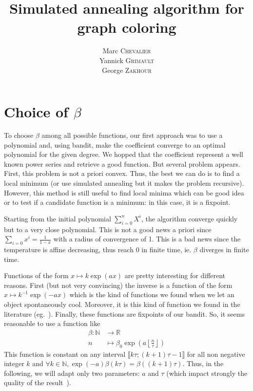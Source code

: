 \documentclass[a4paper, 11pt]{article}
\title{Simulated annealing algorithm for graph coloring}
\author{
	Marc \textsc{Chevalier}\\
	Yannick \textsc{Grimault}\\
	George \textsc{Zakhour}
}
\newcommand{\RR}{\mathbb{R}}
\newcommand{\NN}{\mathbb{N}}
\newcommand{\floor}[1]{{\left\lfloor #1 \right\rfloor}}
\begin{document}
\maketitle

\section{Choice of \texorpdfstring{$\beta$}{β}}


To choose $\beta$ among all possible functions, our first approach was to use a polynomial and, using bandit, make the coefficient converge to an optimal polynomial for the given degree. We hopped that the coefficient represent a well known power series and retrieve a good function. But several problem appears. First, this problem is not a priori convex. Thus, the best we can do is to find a local minimum (or use simulated annealing but it makes the problem recursive). However, this method is still useful to find local minima which can be good idea or to test if a candidate function is a minimum: in this case, it is a fixpoint.

Starting from the initial polynomial $\sum\limits_{i=0}^n X^i$, the algorithm converge quickly but to a very close polynomial. This is not a good news a priori since $\sum\limits_{i=0} x^i = \frac{1}{1-x}$ with a radius of convergence of 1. This is a bad news since the temperature is affine decreasing, thus reach 0 in finite time, ie. $\beta$ diverges in finite time.

\bigskip

Functions of the form $x\mapsto k\exp(ax)$ are pretty interesting for different reasons. First (but not very convincing) the inverse is a function of the form $x\mapsto k^{-1}\exp(-ax)$ which is the kind of functions we found when we let an object spontaneously cool. Moreover, it is this kind of function we found in the literature (eg.~\cite{chams1987some}). Finally, these functions are fixpoints of our bandit. So, it seems reasonable to use a function like
\[
	\begin{aligned}
		\beta : \NN &\to \RR\\
		n &\mapsto \beta_0\exp\left(a\floor{\frac{n}{\tau}}\right)
	\end{aligned}
\]
This function is constant on any interval $\llbracket k\tau; (k+1)\tau -1\rrbracket$ for all non negative integer $k$ and $\forall k\in\NN, \exp(-a)\beta(k\tau) = \beta((k+1)\tau)$. Thus, in the following, we will adapt only two parameters: $a$ and $\tau$ (which impact strongly the quality of the result~\cite{chams1987some}).
\end{document}
